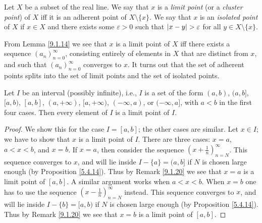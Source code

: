 \begin{definition}\label{9.1.18}
    Let \(X\) be a subset of the real line.
    We say that \(x\) is a \emph{limit point} (or a \emph{cluster point}) of \(X\) iff it is an adherent point of \(X \setminus \{x\}\).
    We say that \(x\) is an \emph{isolated point} of \(X\) if \(x \in X\) and there exists some \(\varepsilon > 0\) such that \(\abs*{x - y} > \varepsilon\) for all \(y \in X \setminus \{x\}\).
\end{definition}

\setcounter{theorem}{19}
\begin{remark}\label{9.1.20}
    From Lemma \ref{9.1.14} we see that \(x\) is a limit point of \(X\) iff there exists a sequence \((a_n)_{n = 0}^\infty\), consisting entirely of elements in \(X\) that are distinct from \(x\), and such that \((a_n)_{n = 0}^\infty\) converges to \(x\).
    It turns out that the set of adherent points splits into the set of limit points and the set of isolated points.
\end{remark}

\begin{lemma}\label{9.1.21}
    Let \(I\) be an interval (possibly infinite), i.e., \(I\) is a set of the form \((a, b)\), \((a, b]\), \([a, b)\), \([a, b]\), \((a, +\infty)\), \([a, +\infty)\), \((-\infty, a)\), or \((-\infty, a]\), with \(a < b\) in the first four cases.
    Then every element of \(I\) is a limit point of \(I\).
\end{lemma}

\begin{proof}
    We show this for the case \(I = [a, b]\);
    the other cases are similar.
    Let \(x \in I\);
    we have to show that \(x\) is a limit point of \(I\).
    There are three cases: \(x = a\), \(a < x < b\), and \(x = b\).
    If \(x = a\), then consider the sequence \((x + \frac{1}{n})_{n = N}^\infty\).
    This sequence converges to \(x\), and will lie inside \(I - \{a\} = (a, b]\) if \(N\) is chosen large enough (by Proposition \ref{5.4.14}).
    Thus by Remark \ref{9.1.20} we see that \(x = a\) is a limit point of \([a, b]\).
    A similar argument works when \(a < x < b\).
    When \(x = b\) one has to use the sequence \((x - \frac{1}{n})_{n = N}^\infty\) instead.
    This sequence converges to \(x\), and will lie inside \(I - \{b\} = [a, b)\) if \(N\) is chosen large enough (by Proposition \ref{5.4.14}).
    Thus by Remark \ref{9.1.20} we see that \(x = b\) is a limit point of \([a, b]\).
\end{proof}

